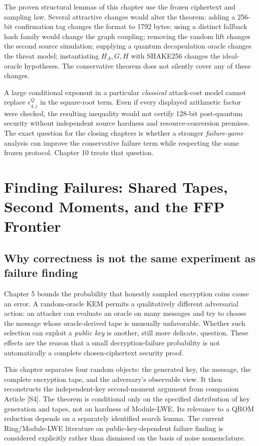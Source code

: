 \documentclass[
  11pt,
  a4paper,
  oneside]{report}
\begin{document}
The proven structural lemmas of this chapter use the frozen ciphertext
and sampling law. Several attractive changes would alter the theorem:
adding a 256-bit confirmation tag changes the format to 1792 bytes;
using a distinct fallback hash family would change the graph coupling;
removing the random lift changes the second source simulation; supplying
a quantum decapsulation oracle changes the threat model; instantiating
\(H_A,G,H\) with SHAKE256 changes the ideal-oracle hypotheses. The
conservative theorem does not silently cover any of these changes.

A large conditional exponent in a particular \emph{classical}
attack-cost model cannot replace \(\epsilon_{4,j}^{Q}\) in the
square-root term. Even if every displayed arithmetic factor were
checked, the resulting inequality would not certify 128-bit post-quantum
security without independent source hardness and resource-conversion
premises. The exact question for the closing chapters is whether a
stronger \emph{failure-game} analysis can improve the conservative
failure term while respecting the same frozen protocol. Chapter 10
treats that question.

\chapter{Finding Failures: Shared Tapes, Second Moments, and the FFP
Frontier}\label{finding-failures-shared-tapes-second-moments-and-the-ffp-frontier}

\section{Why correctness is not the same experiment as failure
finding}\label{why-correctness-is-not-the-same-experiment-as-failure-finding}

Chapter 5 bounds the probability that honestly sampled encryption coins
cause an error. A random-oracle KEM permits a qualitatively different
adversarial action: an attacker can evaluate an oracle on many messages
and try to choose the message whose oracle-derived tape is unusually
unfavorable. Whether such selection can exploit a \emph{public key} is
another, still more delicate, question. These effects are the reason
that a small decryption-failure probability is not automatically a
complete chosen-ciphertext security proof.

This chapter separates four random objects: the generated key, the
message, the complete encryption tape, and the adversary's observable
view. It then reconstructs the independent-key second-moment argument
from companion Article {[}S4{]}. The theorem is conditional only on the
specified distribution of key generation and tapes, not on hardness of
Module-LWE. Its relevance to a QROM reduction depends on a separately
identified search lemma. The current Ring/Module-LWE literature on
public-key-dependent failure finding is considered explicitly rather
than dismissed on the basis of noise nomenclature.
\end{document}
